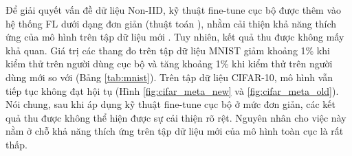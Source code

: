 Để giải quyết vấn đề dữ liệu Non-IID, kỹ thuật fine-tune cục bộ được thêm vào hệ thống FL dưới dạng đơn giản (thuật toán ), nhằm cải thiện khả năng thích ứng của mô hình trên tập dữ liệu mới . Tuy nhiên, kết quả thu được không mấy khả quan. Giá trị các thang đo trên tập dữ liệu MNIST giảm khoảng 1\% khi kiểm thử trên người dùng cục bộ và tăng khoảng 1\% khi kiểm thử trên người dùng mới so với  (Bảng \ref{tab:mnist}). Trên tập dữ liệu CIFAR-10, mô hình vẫn tiếp tục không đạt hội tụ (Hình \ref{fig:cifar_meta_new} và \ref{fig:cifar_meta_old}). Nói chung, sau khi áp dụng kỹ thuật fine-tune cục bộ ở mức đơn giản, các kết quả thu được không thể hiện được sự cải thiện rõ rệt. Nguyên nhân cho việc này nằm ở chỗ khả năng thích ứng trên tập dữ liệu mới của mô hình toàn cục là rất thấp.

